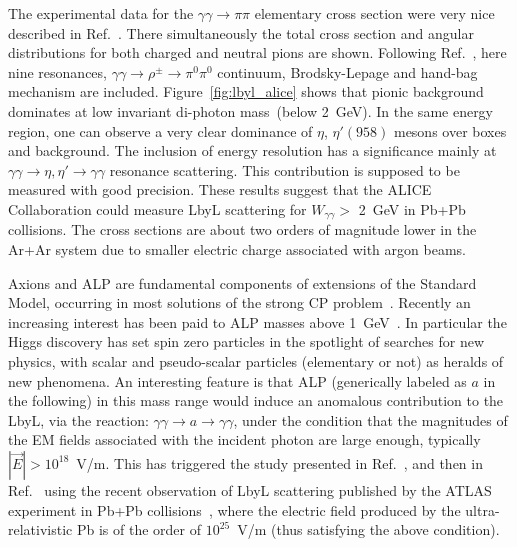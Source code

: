 \documentclass[../report.tex]{subfiles}
\begin{document}
The experimental data for the $\gamma\gamma\to\pi\pi$ elementary cross section were very nice described in Ref.~\cite{Klusek-Gawenda:2013rtu}.
There simultaneously the total cross section and angular distributions for both charged and neutral pions are shown.
Following Ref.~\cite{Klusek-Gawenda:2013rtu}, here nine resonances,
$\gamma\gamma\to\rho^\pm\to\pi^0\pi^0$ continuum, Brodsky-Lepage and hand-bag mechanism are included. Figure~\ref{fig:lbyl_alice} shows that pionic background dominates at low invariant di-photon mass~(below 2~GeV).
In the same energy region, one can observe a very clear dominance of
$\eta$, $\eta'(958)$ mesons over boxes and background.
The inclusion of energy resolution has a significance mainly at
$\gamma\gamma\to\eta,\eta'\to\gamma\gamma$ resonance scattering.
This contribution is supposed to be measured with good precision.
These results suggest that the ALICE Collaboration could measure LbyL scattering for $W_{\gamma\gamma}>$ 2~GeV in Pb+Pb collisions. The cross sections are about two orders of magnitude lower in the Ar+Ar system due to smaller electric charge associated with argon beams.


Axions and ALP are fundamental components of extensions of the Standard Model, occurring in most solutions of the strong CP problem~\cite{Peccei:1977hh,PhysRevLett.38.1440}. Recently an increasing interest has been paid to ALP masses
above 1~GeV~\cite{Bauer:2017ris}. In particular the Higgs discovery has set spin zero particles in the spotlight of searches for new physics, with scalar and pseudo-scalar particles (elementary or not) as heralds of new phenomena. An interesting feature is that ALP (generically labeled as $a$ in the following) in this mass range would induce an anomalous contribution to the LbyL, via the reaction:
$\gamma \gamma \rightarrow a \rightarrow \gamma \gamma$,
under the condition that the magnitudes of the EM fields associated
with the incident photon are large enough, typically $\left|\vec{E}\right| >10^{18}$~V/m.
This has triggered  the study presented in Ref.~\cite{Knapen:2016moh},
and then in Ref.~\cite{Knapen:2017ebd} using the recent observation of LbyL scattering published by the ATLAS experiment in Pb+Pb collisions~\cite{Aaboud:2017bwk}, where the electric field produced by the ultra-relativistic Pb is of the order of $10^{25}$~V/m (thus satisfying the above condition).
\end{document}
